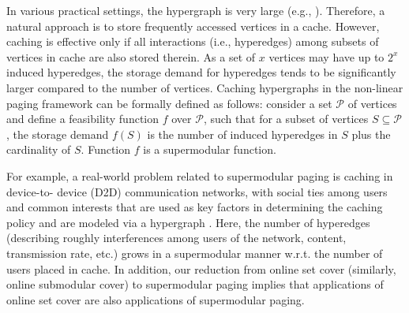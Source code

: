 \documentclass[11pt]{article}
\begin{document}
In various practical settings, the hypergraph is very large (e.g., \cite{ruggeri2023community,murakami2013efficient,huang2015scalable}). Therefore, a natural approach is to store frequently accessed vertices in a cache. However, caching is effective only if all interactions (i.e., hyperedges) among subsets of vertices in cache are also stored therein. As a set of $x$ vertices may have up to $2^x$ induced hyperedges, the storage demand for hyperedges tends to be significantly larger compared to the number of vertices. Caching hypergraphs in the non-linear paging framework can be formally defined as follows: consider a set $\mathcal{P}$ of vertices and define a feasibility function $f$ over $\mathcal{P}$, such that for a subset of vertices $S \subseteq \mathcal{P}$, the storage demand $f(S)$ is the number of induced hyperedges in $S$ plus the cardinality of $S$. Function $f$  is a supermodular function.

For example, a real-world problem related to supermodular paging is caching in device-to-
device (D2D) communication networks, with social ties among users and common interests that are used
as key factors in determining the caching policy and are modeled via a hypergraph \cite{bai2016caching}. Here, the number
of hyperedges (describing roughly interferences among users of the network, content, transmission rate,
etc.) grows in a supermodular manner w.r.t. the number of users placed in cache. In addition, our
reduction from online set cover (similarly, online submodular cover) to supermodular paging implies that
applications of online set cover are also applications of supermodular paging.
\end{document}
